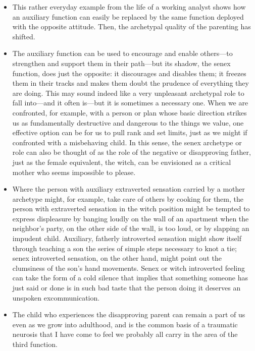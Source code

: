 \begin{itemize}
\item This rather everyday example from the life of a working analyst shows how
an auxiliary function can easily be replaced by the same function deployed with
the opposite attitude. Then, the archetypal quality of the parenting has
shifted.

\item The auxiliary function can be used to encourage and enable others—to
strengthen and support them in their path—but its shadow, the senex function,
does just the opposite: it discourages and disables them; it freezes them in
their tracks and makes them doubt the prudence of everything they are doing.
This may sound indeed like a very unpleasant archetypal role to fall into—and
it often is—but it is sometimes a necessary one. When we are confronted, for
example, with a person or plan whose basic direction strikes us as
fundamentally destructive and dangerous to the things we value, one effective
option can be for us to pull rank and set limits, just as we might if
confronted with a misbehaving child. In this sense, the senex archetype or role
can also be thought of as the role of the negative or disapproving father, just
as the female equivalent, the witch, can be envisioned as a critical mother who
seems impossible to please.

\item Where the person with auxiliary extraverted sensation carried by a mother
archetype might, for example, take care of others by cooking for them, the
person with extraverted sensation in the witch position might be tempted to
express displeasure by banging loudly on the wall of an apartment when the
neighbor's party, on the other side of the wall, is too loud, or by slapping an
impudent child. Auxiliary, fatherly introverted sensation might show itself
through teaching a son the series of simple steps necessary to knot a tie;
senex introverted sensation, on the other hand, might point out the clumsiness
of the son's hand movements. Senex or witch introverted feeling can take the
form of a cold silence that implies that something someone has just said or
done is in such bad taste that the person doing it deserves an unspoken
excommunication.

\item The child who experiences the disapproving parent can remain a part of us
even as we grow into adulthood, and is the common basis of a traumatic neurosis
that I have come to feel we probably all carry in the area of the third
function.


\end{itemize}
